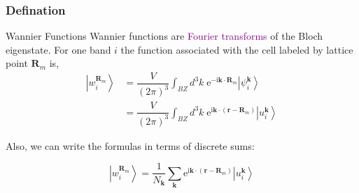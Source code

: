 \documentclass{beamer}
\begin{document}
  \begin{frame}
    \frametitle{Defination}
    \begin{block}{Wannier Functions}
      Wannier functions are \textcolor{purple}{Fourier transforms} of the Bloch eigenstate. For one band \(i\) the function associated with the cell labeled by lattice point \(\mathbf{R}_m\) is,
      \begin{equation}
        \begin{aligned}
          \left|w_i^{\mathbf{R}_m}\right\rangle &= \dfrac{V}{(2\pi)^3}\int_{BZ}d^3k\;\mathrm{e}^{-\mathrm{i}\mathbf{k}\cdot\mathbf{R}_m}\left|\psi_i^{\mathbf{k}}\right\rangle\\
          &=\dfrac{V}{(2\pi)^3}\int_{BZ}d^3k\;\mathrm{e}^{\mathrm{i}\mathbf{k}\cdot(\mathbf{r}-\mathbf{R}_m)}\left|u_i^{\mathbf{k}}\right\rangle
        \end{aligned}
      \end{equation}

      Also, we can write the formulas in terms of discrete sums:

      \begin{equation}
        \left|w_i^{\mathbf{R}_m}\right\rangle =\dfrac{1}{N_\mathbf{k}}\sum_{\mathbf{k}}\mathrm{e}^{\mathrm{i}\mathbf{k}\cdot(\mathbf{r}-\mathbf{R}_m)}\left|u_i^{\mathbf{k}}\right\rangle
      \end{equation}
    \end{block}

    \end{frame}
\end{document}
